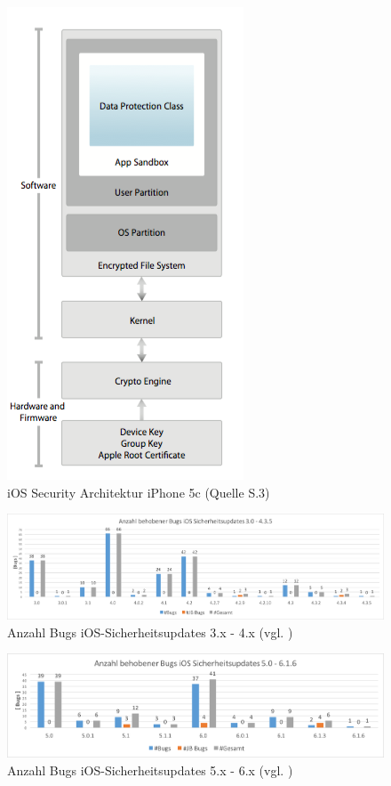 \begin{figure}[htbp!]
    \centering 
		        \includegraphics[scale=0.3]{Bilder/SecArchitektur-iOS7.png}
	\caption {iOS Security Architektur iPhone 5c (Quelle \cite{Apple[9]} S.3) } 
    \label{fig:iOSSecurityArchitekturiOS7}
\end{figure}

\begin{figure}[htbp!]
        \centering
                \includegraphics[scale=0.4]{Bilder/iOSSicherheitsupdate3.png}
        \caption{Anzahl Bugs iOS-Sicherheitsupdates 3.x - 4.x  (vgl. \cite{Apple[7]}) \protect\footnotemark}
        \label{fig:AnalyseiOSSicherheitsupdate3}
\end{figure}

\begin{figure}[htbp!]
        \centering
                \includegraphics[scale=0.5]{Bilder/iOSSicherheitsupdate5.png}
        \caption{Anzahl Bugs iOS-Sicherheitsupdates 5.x - 6.x (vgl. \cite{Apple[7]}) \protect\footnotemark}
        \label{fig:AnalyseiOSSicherheitsupdate5}
\end{figure}

